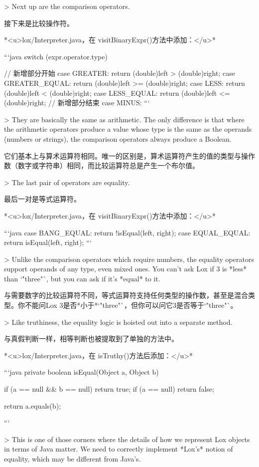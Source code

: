 \documentclass[cn,11pt,chinese]{elegantbook}
\begin{document}
{{{> Next up are the comparison operators.

接下来是比较操作符。

*<u>lox/Interpreter.java，在 visitBinaryExpr()方法中添加：</u>*

```java
    switch (expr.operator.type) {
			// 新增部分开始
      case GREATER:
        return (double)left > (double)right;
      case GREATER_EQUAL:
        return (double)left >= (double)right;
      case LESS:
        return (double)left < (double)right;
      case LESS_EQUAL:
        return (double)left <= (double)right;
      // 新增部分结束
      case MINUS:
```

> They are basically the same as arithmetic. The only difference is that where the arithmetic operators produce a value whose type is the same as the operands (numbers or strings), the comparison operators always produce a Boolean.

它们基本上与算术运算符相同。唯一的区别是，算术运算符产生的值的类型与操作数（数字或字符串）相同，而比较运算符总是产生一个布尔值。

> The last pair of operators are equality.

最后一对是等式运算符。

*<u>lox/Interpreter.java，在 visitBinaryExpr()方法中添加：</u>*

```java
      case BANG_EQUAL: return !isEqual(left, right);
      case EQUAL_EQUAL: return isEqual(left, right);
```

> Unlike the comparison operators which require numbers, the equality operators support operands of any type, even mixed ones. You can’t ask Lox if 3 is *less* than `"three"`, but you can ask if it’s *equal* to it.

与需要数字的比较运算符不同，等式运算符支持任何类型的操作数，甚至是混合类型。你不能问Lox 3是否*小于*`"three"`，但你可以问它3是否等于`"three"`。

> Like truthiness, the equality logic is hoisted out into a separate method.

与真假判断一样，相等判断也被提取到了单独的方法中。

*<u>lox/Interpreter.java，在 isTruthy()方法后添加：</u>*

```java
  private boolean isEqual(Object a, Object b) {
    if (a == null && b == null) return true;
    if (a == null) return false;

    return a.equals(b);
  }
```

> This is one of those corners where the details of how we represent Lox objects in terms of Java matter. We need to correctly implement *Lox’s* notion of equality, which may be different from Java’s.

}}}}
\end{document}
